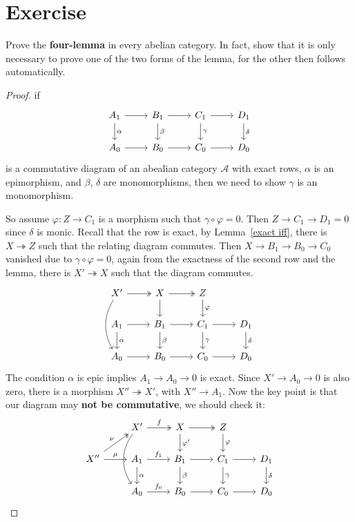 \section{Exercise}
\begin{exercise}
Prove the \textbf{four-lemma} in every abelian category. In fact, show that it is only necessary to prove one of the two forms of the lemma, for the other then follows automatically.
\end{exercise}
\begin{proof}
if
\[\begin{tikzcd}
A_1\ar[r]\ar[d,"\alpha"]&B_1\ar[d,"\beta"]\ar[r]&C_1\ar[d,"\gamma"]\ar[r]&D_1\ar[d,"\delta"]\\
A_0\ar[r]&B_0\ar[r]&C_0\ar[r]&D_0
\end{tikzcd}\]
is a commutative diagram of an abealian category $\mathcal{A}$ with exact rows, $\alpha$ is an epimorphism, and $\beta$, $\delta$ are monomorphisms, then we need to show $\gamma$ is an monomorphism.\par
So assume $\varphi:Z\to C_1$ is a morphism such that $\gamma\circ\varphi=0$. Then $Z\to C_1\to D_1=0$ since $\delta$ is monic. Recall that the row is exact, by Lemma~\ref{exact iff}, there is $X\twoheadrightarrow Z$ such that the relating diagram commutes. Then $X\to B_1\to B_0\to C_0$ vanished due to $\gamma\circ\varphi=0$, again from the exactness of the second row and the lemma, there is $X'\twoheadrightarrow X$ such that the diagram commutes. 
\[\begin{tikzcd}
X'\ar[dd,bend right]\ar[r,twoheadrightarrow]&X\ar[d]\ar[r,twoheadrightarrow]&Z\ar[d,"\varphi"]\\
A_1\ar[r]\ar[d,"\alpha"]&B_1\ar[d,"\beta"]\ar[r]&C_1\ar[d,"\gamma"]\ar[r]&D_1\ar[d,"\delta"]\\
A_0\ar[r]&B_0\ar[r]&C_0\ar[r]&D_0
\end{tikzcd}\]
The condition $\alpha$ is epic implies $A_1\to A_0\to 0$ is exact. Since $X'\to A_0\to 0$ is also zero, there is a morphism $X''\twoheadrightarrow X'$, with $X''\to A_1$. Now the key point is that our diagram may \textbf{not be commutative}, we should check it:
\[\begin{tikzcd}
&X'\ar[dd,bend right=35]\ar[r,twoheadrightarrow,"f"]&X\ar[d,"\varphi'"]\ar[r,twoheadrightarrow]&Z\ar[d,"\varphi"]\\
X''\ar[r,"\mu"]\ar[ru,twoheadrightarrow,"\nu"]&A_1\ar[r,"f_1"]\ar[d,"\alpha"]&B_1\ar[d,"\beta"]\ar[r]&C_1\ar[d,"\gamma"]\ar[r]&D_1\ar[d,"\delta"]\\
&A_0\ar[r,"f_0"]&B_0\ar[r]&C_0\ar[r]&D_0

\end{tikzcd}\]
\end{proof}
